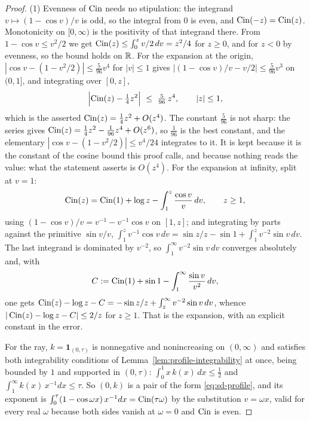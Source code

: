 \begin{proof}
(1) Evenness of $\operatorname{Cin}$ needs no stipulation: the integrand $v \mapsto (1 - \cos v)/v$ is odd,
so the integral from $0$ is even, and $\operatorname{Cin}(-z) = \operatorname{Cin}(z)$. Monotonicity on $[0,\infty)$ is the
positivity of that integrand there. From $1 - \cos v \le v^2/2$ we get
$\operatorname{Cin}(z) \le \int_0^z v/2\,dv = z^2/4$ for $z \ge 0$, and for $z < 0$ by evenness, so the bound
holds on $\mathbb{R}$. For the expansion at the origin, $|\cos v - (1 - v^2/2)| \le \tfrac{5}{96}v^4$
for $|v| \le 1$ gives $|(1-\cos v)/v - v/2| \le \tfrac{5}{96}v^3$ on $(0,1]$, and integrating
over $[0,z]$,
\[
  \Bigl|\Cin(z) - \tfrac14 z^2\Bigr| \ \le\ \tfrac{5}{96}\,z^4,
  \qquad |z| \le 1,
\]
which is the asserted $\operatorname{Cin}(z) = \tfrac14z^2 + O(z^4)$. The constant $\tfrac5{96}$ is not sharp:
the series gives $\operatorname{Cin}(z) = \tfrac14z^2 - \tfrac1{96}z^4 + O(z^6)$, so $\tfrac1{96}$ is the best
constant, and the elementary $|\cos v - (1 - v^2/2)| \le v^4/24$ integrates to it. It is kept
because it is the constant of the cosine bound this proof calls, and because nothing reads the
value: what the statement asserts is $O(z^4)$. For the expansion at infinity, split at
$v = 1$:
\[
  \operatorname{Cin}(z) = \operatorname{Cin}(1) + \log z - \int_1^z \frac{\cos v}{v}\,dv , \qquad z \ge 1,
\]
using $(1-\cos v)/v = v^{-1} - v^{-1}\cos v$ on $[1,z]$; and integrating by parts against the
primitive $\sin v/v$,
$\int_1^z v^{-1}\cos v\,dv = \sin z/z - \sin 1 + \int_1^z v^{-2}\sin v\,dv$. The last integrand
is dominated by $v^{-2}$, so $\int_1^\infty v^{-2}\sin v\,dv$ converges absolutely and, with
\[
  C := \operatorname{Cin}(1) + \sin 1 - \int_1^\infty \frac{\sin v}{v^2}\,dv ,
\]
one gets $\operatorname{Cin}(z) - \log z - C = -\sin z/z + \int_z^\infty v^{-2}\sin v\,dv$, whence
$|\operatorname{Cin}(z) - \log z - C| \le 2/z$ for $z \ge 1$. That is the expansion, with an explicit
constant in the error.

For the ray, $k = \mathbf 1_{(0,\tau)}$ is nonnegative and nonincreasing on $(0,\infty)$ and
satisfies both integrability conditions of Lemma~\ref{lem:profile-integrability} at once,
being bounded by $1$ and supported in $(0,\tau)$: $\int_0^1 x\,k(x)\,dx \le \tfrac12$ and
$\int_1^\infty k(x)\,x^{-1}dx \le \tau$. So $(0,k)$ is a pair of the form \ref{eq:sd-profile},
and its exponent is
$\int_0^\tau (1-\cos\omega x)\,x^{-1}dx = \operatorname{Cin}(\tau\omega)$ by the substitution $v = \omega x$,
valid for every real $\omega$ because both sides vanish at $\omega = 0$ and $\operatorname{Cin}$ is even.


\end{proof}
